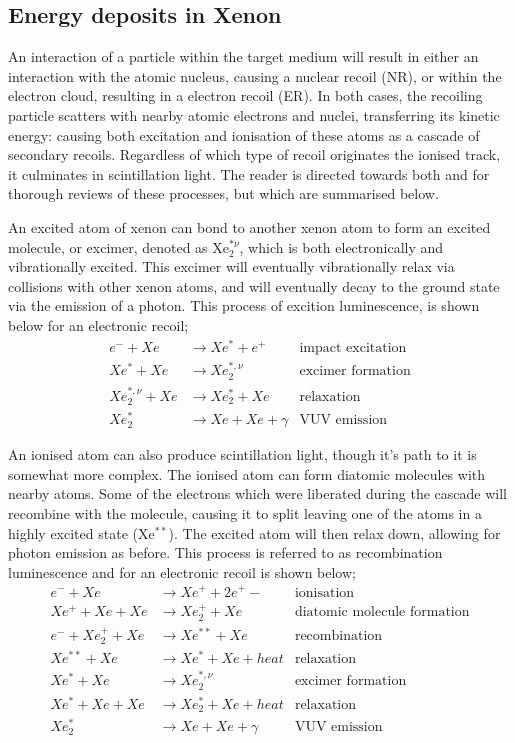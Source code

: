 \subsection{Energy deposits in Xenon}
\par
An interaction of a particle within the target medium will result in either an interaction with the atomic nucleus, causing a nuclear recoil (NR), or within the electron cloud, resulting in a electron recoil (ER).
In both cases, the recoiling particle scatters with nearby atomic electrons and nuclei, transferring its kinetic energy: causing both excitation and ionisation of these atoms as a cascade of secondary recoils.
Regardless of which type of recoil originates the ionised track, it culminates in scintillation light.
The reader is directed towards both \cite{xenon_physics_ref} and \cite{carldahl_thesis_ref} for thorough reviews of these processes, but which are summarised below.
\par
An excited atom of xenon can bond to another xenon atom to form an excited molecule, or excimer, denoted as Xe$_2^{*\nu}$, which is both electronically and vibrationally excited.
This excimer will eventually vibrationally relax via collisions with other xenon atoms, and will eventually decay to the ground state via the emission of a photon.
This process of excition luminescence, is shown below for an electronic recoil;
\begin{align*}
    e^- + Xe &\rightarrow Xe^* + e^+  &\text{impact excitation} \\ 
    Xe^* + Xe &\rightarrow Xe_2^{*,\nu} &\text{excimer formation} \\
    Xe_2^{*,\nu} + Xe &\rightarrow Xe_2^* + Xe &\text{relaxation} \\
    Xe_2^* &\rightarrow Xe + Xe + \gamma &\text{VUV emission} 
\end{align*}
\par
An ionised atom can also produce scintillation light, though it's path to it is somewhat more complex.
The ionised atom can form diatomic molecules with nearby atoms.
Some of the electrons which were liberated during the cascade will recombine with the molecule, causing it to split leaving one of the atoms in a highly excited state (Xe$^{**}$).
The excited atom will then relax down, allowing for photon emission as before.
This process is referred to as recombination luminescence and for an electronic recoil is shown below;
\begin{align*}
    e^- + Xe &\rightarrow Xe^+ + 2e^+- &\text{ionisation} \\ 
    Xe^+ + Xe + Xe &\rightarrow Xe_2^{+} + Xe &\text{diatomic molecule formation} \\
    e^- + Xe_2^+ + Xe&\rightarrow Xe^{**} + Xe &\text{recombination} \\
    Xe^{**} + Xe &\rightarrow Xe^{*} + Xe + heat &\text{relaxation} \\
    Xe^{*} + Xe  &\rightarrow Xe_2^{*,\nu} &\text{excimer formation} \\
    Xe^{*} + Xe + Xe &\rightarrow Xe_2^{*} + Xe + heat &\text{relaxation} \\
    Xe_2^* &\rightarrow Xe + Xe + \gamma &\text{VUV emission} 
\end{align*}
